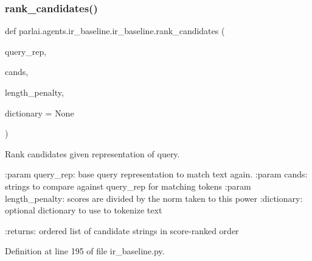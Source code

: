 \subsubsection{\texorpdfstring{rank\+\_\+candidates()}{rank\_candidates()}}
{\footnotesize\ttfamily def parlai.\+agents.\+ir\+\_\+baseline.\+ir\+\_\+baseline.\+rank\+\_\+candidates (\begin{DoxyParamCaption}\item[{}]{query\+\_\+rep,  }\item[{}]{cands,  }\item[{}]{length\+\_\+penalty,  }\item[{}]{dictionary = {\ttfamily None} }\end{DoxyParamCaption})}

\begin{DoxyVerb}Rank candidates given representation of query.

:param query_rep: base query representation to match text again.
:param cands: strings to compare against query_rep for matching tokens
:param length_penalty: scores are divided by the norm taken to this power
:dictionary: optional dictionary to use to tokenize text

:returns: ordered list of candidate strings in score-ranked order
\end{DoxyVerb}
 

Definition at line 195 of file ir\+\_\+baseline.\+py.


